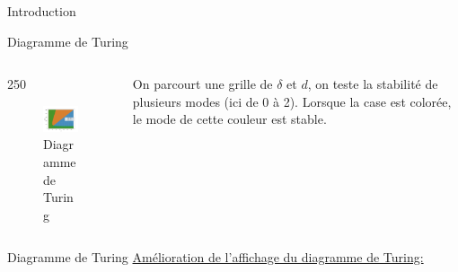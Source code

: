 \documentclass{beamer}
\begin{document}
\begin{frame}{Introduction}
\begin{frame}{Diagramme de Turing}
\begin{columns}
    \begin{column}{250}
    \begin{figure}
    \includegraphics[width=220]{diagrammes_turing3_1.png}
    \caption{\label{diagramme_turing_1}{Diagramme de Turing}}
    \end{figure}
    \end{column}
    
    \begin{column}{2.7cm}
    On parcourt une grille de $\delta$ et $d$, on teste la stabilité de plusieurs modes (ici de 0 à 2). Lorsque la case est colorée, le mode de cette couleur est stable.
    
    \end{column}
    \end{columns}
    
    
\end{frame}

\begin{frame}{Diagramme de Turing}
    \underline{Amélioration de l'affichage du diagramme de Turing:}
    
    \begin{columns}


\end{columns}
\end{frame}
\end{frame}
\end{document}
